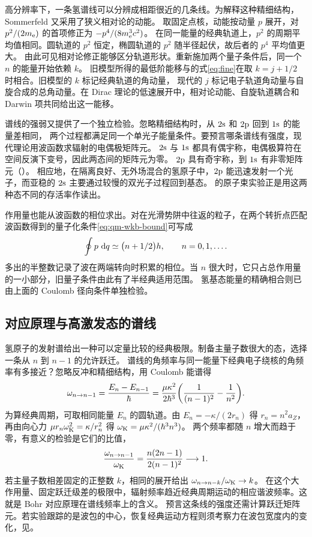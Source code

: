 高分辨率下，一条氢谱线可以分辨成相距很近的几条线。为解释这种精细结构，Sommerfeld 又采用了狭义相对论的动能。
取固定点核，动能按动量 $p$ 展开，对 $p^2/(2m_{\mathrm{e}})$ 的首项修正为 $-p^4/(8m_{\mathrm{e}}^3c^2)$。
在同一能量的经典轨道上，$p^2$ 的周期平均值相同。圆轨道的 $p^2$ 恒定，椭圆轨道的 $p^2$ 随半径起伏，故后者的 $p^4$ 平均值更大。
由此可见相对论修正能够区分轨道形状。重新施加两个量子条件后，同一个 $n$ 的能量开始依赖 $k$。
旧模型所得的最低阶能移与的式\eqref{eq:fine}在取 $k = j + 1/2$ 时相合。旧模型的 $k$ 标记经典轨道的角动量，
现代的 $j$ 标记电子轨道角动量与自旋合成的总角动量。在 Dirac 理论的低速展开中，相对论动能、自旋轨道耦合和 Darwin 项共同给出这一能移。

谱线的强弱又提供了一个独立检验。忽略精细结构时，从 $2\mathrm{s}$ 和 $2\mathrm{p}$ 回到 $1\mathrm{s}$ 的能量差相同，
两个过程都满足同一个单光子能量条件。要预言哪条谱线有强度，现代理论用波函数求辐射的电偶极矩阵元。
$2\mathrm{s}$ 与 $1\mathrm{s}$ 都具有偶宇称，电偶极算符在空间反演下变号，因此两态间的矩阵元为零。
$2\mathrm{p}$ 具有奇宇称，到 $1\mathrm{s}$ 有非零矩阵元（）。
相应地，在隔离良好、无外场混合的氢原子中，$2\mathrm{p}$ 能迅速发射一个光子，而亚稳的 $2\mathrm{s}$ 主要通过较慢的双光子过程回到基态。
的原子束实验正是用这两种态不同的存活率作读出\cite{lamb}。

作用量也能从波函数的相位求出。对在光滑势阱中往返的粒子，在两个转折点匹配波函数得到的量子化条件\eqref{eq:qm-wkb-bound}可写成
\[
    \oint p\,\mathop{}\!\mathrm{d} q \simeq \bigl(n + 1/2\bigr)h,
    \qquad n = 0,1,\ldots.
\]
多出的半整数记录了波在两端转向时积累的相位。当 $n$ 很大时，它只占总作用量的一小部分，旧量子条件由此有了半经典适用范围。
氢基态能量的精确相合则已由上面的 Coulomb 径向条件单独检验。

\subsection{对应原理与高激发态的谱线}
\label{ss:qm-correspondence}
氢原子的发射谱给出一种可以定量比较的经典极限。制备主量子数很大的态，选择一条从 $n$ 到 $n-1$ 的允许跃迁。
谱线的角频率与同一能量下经典电子绕核的角频率有多接近？忽略反冲和精细结构，用 Coulomb 能谱得
\begin{equation}\label{eq:qm-correspondence-frequency}
    \omega_{n\to n-1} = \frac{E_n - E_{n-1}}{\hbar}
       = \frac{\mu\kappa^2}{2\hbar^3}
         \biggl(\frac{1}{(n - 1)^2} - \frac{1}{n^2}\biggr) .
\end{equation}
为算经典周期，可取相同能量 $E_n$ 的圆轨道。由 $E_n = -\kappa/(2r_n)$ 得 $r_n = n^2a_Z$，
再由向心力 $\mu r_n\omega_{\mathrm{K}}^2 = \kappa/r_n^2$ 得 $\omega_{\mathrm{K}} = \mu\kappa^2/(\hbar^3 n^3)$。
两个频率都随 $n$ 增大而趋于零，有意义的检验是它们的比值，
\[
    \frac{\omega_{n\to n-1}}{\omega_{\mathrm{K}}}
        = \frac{n(2n - 1)}{2(n - 1)^2} \longrightarrow 1 .
\]
若主量子数相差固定的正整数 $k$，相同的展开给出 $\omega_{n\to n-k}/\omega_{\mathrm{K}} \to k$。
在这个大作用量、固定跃迁级差的极限中，辐射频率趋近经典周期运动的相应谐波频率。这就是 Bohr 对应原理在谱线频率上的含义\cite{bohrlecture}。
预言这条线的强度还需计算跃迁矩阵元。若实验跟踪的是波包的中心，恢复经典运动方程则须考察力在波包宽度内的变化，见。

